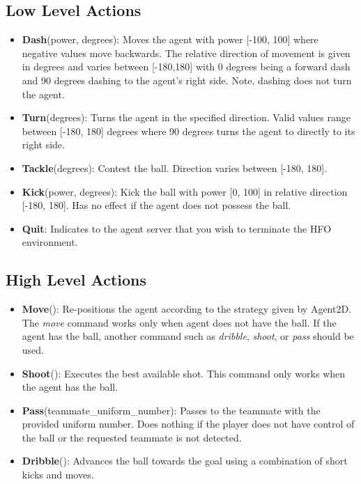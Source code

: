 \documentclass[12pt]{article}
\begin{document}
\subsection{Low Level Actions}
\begin{itemize}
\item{\textbf{Dash}(power, degrees): Moves the agent with power [-100,
    100] where negative values move backwards. The relative direction
  of movement is given in degrees and varies between [-180,180] with 0
  degrees being a forward dash and 90 degrees dashing to the agent's
  right side. Note, dashing does not turn the agent.}
\item{\textbf{Turn}(degrees): Turns the agent in the
  specified direction. Valid values range between [-180, 180] degrees
  where 90 degrees turns the agent to directly to its right side.}
\item{\textbf{Tackle}(degrees): Contest the ball. Direction
  varies between [-180, 180].}
\item{\textbf{Kick}(power, degrees): Kick the ball with power [0, 100]
  in relative direction [-180, 180]. Has no effect if the agent does
  not possess the ball.}
\item{\textbf{Quit}: Indicates to the agent server that you wish to
  terminate the HFO environment.}
\end{itemize}

\subsection{High Level Actions}
\begin{itemize}
\item{\textbf{Move}(): Re-positions the agent according to the
  strategy given by Agent2D. The \textit{move} command works only when
  agent does not have the ball. If the agent has the ball, another
  command such as \textit{dribble}, \textit{shoot}, or \textit{pass}
  should be used.}
\item{\textbf{Shoot}(): Executes the best available shot. This command
  only works when the agent has the ball.}
\item{\textbf{Pass}(teammate\_uniform\_number): Passes to the teammate
  with the provided uniform number. Does nothing if the player does
  not have control of the ball or the requested teammate is not
  detected.}
\item{\textbf{Dribble}(): Advances the ball towards the goal using a
  combination of short kicks and moves.}
\end{itemize}
\end{document}
